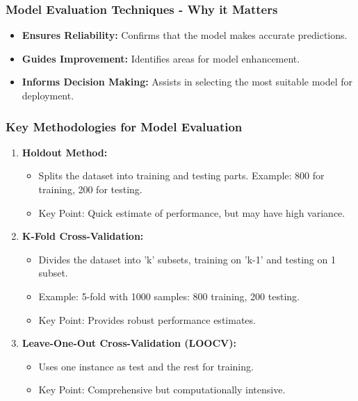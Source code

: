 \documentclass[aspectratio=169]{beamer}
\begin{document}
\begin{frame}[fragile]
    \frametitle{Model Evaluation Techniques - Why it Matters}
    \begin{itemize}
        \item \textbf{Ensures Reliability:} Confirms that the model makes accurate predictions.
        \item \textbf{Guides Improvement:} Identifies areas for model enhancement.
        \item \textbf{Informs Decision Making:} Assists in selecting the most suitable model for deployment.
    \end{itemize}
\end{frame}

\begin{frame}[fragile]
    \frametitle{Key Methodologies for Model Evaluation}
    \begin{enumerate}
        \item \textbf{Holdout Method:}
            \begin{itemize}
                \item Splits the dataset into training and testing parts. Example: 800 for training, 200 for testing.
                \item Key Point: Quick estimate of performance, but may have high variance.
            \end{itemize}

        \item \textbf{K-Fold Cross-Validation:}
            \begin{itemize}
                \item Divides the dataset into 'k' subsets, training on 'k-1' and testing on 1 subset.
                \item Example: 5-fold with 1000 samples: 800 training, 200 testing.
                \item Key Point: Provides robust performance estimates.
            \end{itemize}

        \item \textbf{Leave-One-Out Cross-Validation (LOOCV):}
            \begin{itemize}
                \item Uses one instance as test and the rest for training.
                \item Key Point: Comprehensive but computationally intensive.
            \end{itemize}
    \end{enumerate}
\end{frame}
\end{document}
